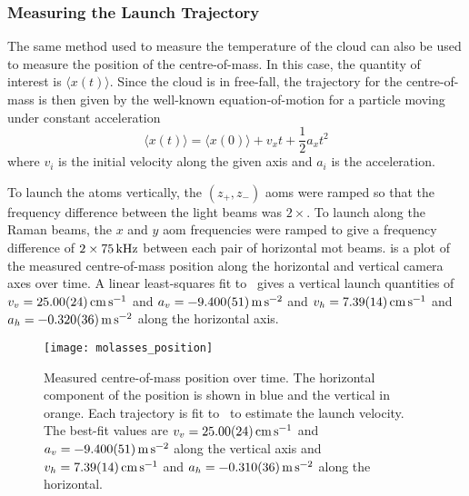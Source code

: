 \subsubsection{Measuring the Launch Trajectory}
The same method used to measure the temperature of the cloud can also
be used to measure the position of the centre-of-mass. In this case,
the quantity of interest is \(\langle x(t)\rangle\). Since the cloud
is in free-fall, the trajectory for the centre-of-mass is then given
by the well-known equation-of-motion for a particle moving under
constant acceleration
\begin{equation}
    \langle x(t) \rangle = \langle x(0) \rangle + v_x t + \frac{1}{2} a_x t^2
    \label{eq:position_free}
\end{equation}
where \(v_i\) is the initial velocity along the given axis and \(a_i\)
is the acceleration.
\par\noindent
To launch the atoms vertically, the \((z_+, z_-)\) \acp{aom} were
ramped so that the frequency difference between the light beams was
\(2\times\). To launch along the Raman
beams, the \(x\) and \(y\) \ac{aom}
frequencies were ramped to give a frequency difference of \(2\times
\sivalue{75}{\kilo\hertz}\) between each pair of horizontal \ac{mot} beams.
 is a plot of the measured
centre-of-mass position along the horizontal and vertical camera axes
over time. A linear least-squares fit
to~ gives a vertical launch quantities
of \(v_v = \sivalue{25.0\pm0.24}{\centi\meter\per\second}\) and \(a_v
= \sivalue{-9.40\pm0.051}{\metre\per\second\squared}\) and \(v_h =
\sivalue{7.39\pm0.14}{\centi\meter\per\second}\) and \(a_h =
\sivalue{-0.32\pm0.036}{\metre\per\second\squared}\) along the
horizontal axis. 
\begin{figure}[!htbp]
    \centering
    \texttt{[image: molasses\_position]}
    \caption[Atom cloud centre-of-mass over time]{Measured
    centre-of-mass position over time. The horizontal component of the
  position is shown in blue and the vertical in orange. Each
trajectory is fit to~ to estimate the
launch velocity. The best-fit values are \(v_v =
\sivalue{25.0\pm0.24}{\centi\meter\per\second}\) and \(a_v =
\sivalue{-9.40\pm0.051}{\metre\per\second\squared}\) along the
vertical axis and \(v_h =
\sivalue{7.39\pm0.14}{\centi\meter\per\second}\) and \(a_h =
\sivalue{-0.31\pm0.036}{\metre\per\second\squared}\) along the
horizontal.}
    \label{fig:molasses_position}
\end{figure}
